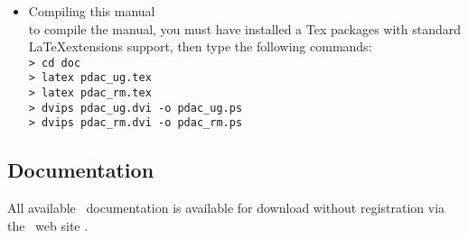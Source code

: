 \begin{itemize}
\item Compiling this manual\\
      to compile the manual, you must have installed a Tex packages
      with standard \LaTeX extensions support, 
      then type the following commands:\\
      {\tt > cd doc}\\
      {\tt > latex pdac\_ug.tex}\\
      {\tt > latex pdac\_rm.tex}\\
      {\tt > dvips pdac\_ug.dvi -o pdac\_ug.ps }\\
      {\tt > dvips pdac\_rm.dvi -o pdac\_rm.ps }\\

\end{itemize}

\subsection{Documentation}

All available \PDAC\ documentation is available for download without
registration via the \PDAC\ web site \PDACURL.

